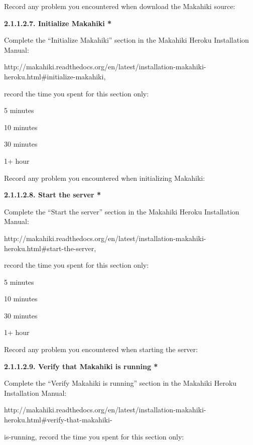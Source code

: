 Record any problem you encountered when download the Makahiki source: \underline{\hspace{3cm}}

{\bf 2.1.1.2.7. Initialize Makahiki *}

Complete the ``Initialize Makahiki'' section in the Makahiki Heroku Installation Manual:

http://makahiki.readthedocs.org/en/latest/installation-makahiki-heroku.html\#initialize-makahiki, 

record the time you spent for this section only:

\begin{radiobutton}
\item 5 minutes
\item  10 minutes
\item  30 minutes
\item  1+ hour
\end{radiobutton}

Record any problem you encountered when initializing Makahiki: \underline{\hspace{4cm}}

{\bf 2.1.1.2.8. Start the server *}

Complete the ``Start the server'' section in the Makahiki Heroku Installation Manual:

http://makahiki.readthedocs.org/en/latest/installation-makahiki-heroku.html\#start-the-server, 

record the time you spent for this section only:

\begin{radiobutton}
\item 5 minutes
\item  10 minutes
\item  30 minutes
\item  1+ hour
\end{radiobutton}

Record any problem you encountered when starting the server: \underline{\hspace{4cm}}

{\bf 2.1.1.2.9. Verify that Makahiki is running *}

Complete the ``Verify Makahiki is running'' section in the Makahiki Heroku Installation Manual:

http://makahiki.readthedocs.org/en/latest/installation-makahiki-heroku.html\#verify-that-makahiki-

is-running, record the time you spent for this section only:

